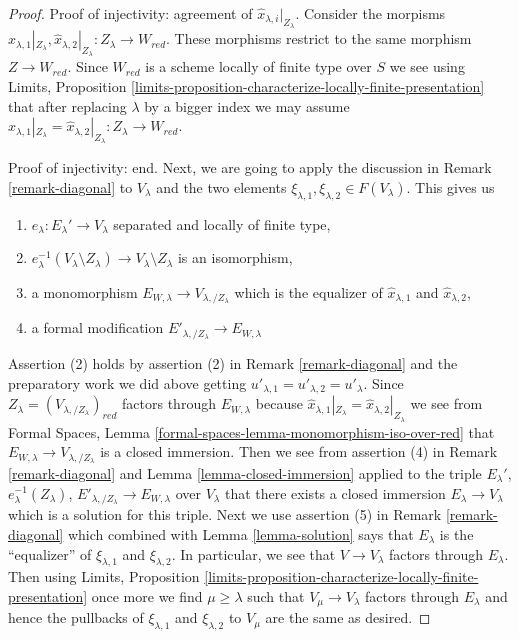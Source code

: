 \begin{proof}
\medskip\noindent
Proof of injectivity: agreement of $\hat x_{\lambda, i}|_{Z_\lambda}$.
Consider the morpisms
$\hat x_{\lambda, 1}|_{Z_\lambda}, \hat x_{\lambda, 2}|_{Z_\lambda} :
Z_\lambda \to W_{red}$.
These morphisms restrict to the same morphism $Z \to W_{red}$.
Since $W_{red}$ is a scheme locally of finite type over $S$
we see using Limits, Proposition
\ref{limits-proposition-characterize-locally-finite-presentation}
that after replacing $\lambda$ by a bigger index
we may assume
$\hat x_{\lambda, 1}|_{Z_\lambda} = \hat x_{\lambda, 2}|_{Z_\lambda} :
Z_\lambda \to W_{red}$.

\medskip\noindent
Proof of injectivity: end.
Next, we are going to apply the discussion in
Remark \ref{remark-diagonal} to $V_\lambda$ and the two elements
$\xi_{\lambda, 1}, \xi_{\lambda, 2} \in F(V_\lambda)$.
This gives us
\begin{enumerate}
\item $e_\lambda : E_\lambda' \to V_\lambda$
separated and locally of finite type,
\item $e_\lambda^{-1}(V_\lambda \setminus Z_\lambda) \to
V_\lambda \setminus Z_\lambda$ is an isomorphism,
\item a monomorphism $E_{W, \lambda} \to V_{\lambda, /Z_\lambda}$
which is the equalizer of $\hat x_{\lambda, 1}$ and $\hat x_{\lambda, 2}$,
\item a formal modification $E'_{\lambda, /Z_\lambda} \to E_{W, \lambda}$
\end{enumerate}
Assertion (2) holds by assertion (2) in Remark \ref{remark-diagonal}
and the preparatory work we did above getting
$u'_{\lambda, 1} = u'_{\lambda, 2} = u'_\lambda$.
Since $Z_\lambda = (V_{\lambda, /Z_\lambda})_{red}$ factors through
$E_{W, \lambda}$ because
$\hat x_{\lambda, 1}|_{Z_\lambda} = \hat x_{\lambda, 2}|_{Z_\lambda}$
we see from
Formal Spaces, Lemma \ref{formal-spaces-lemma-monomorphism-iso-over-red}
that $E_{W, \lambda} \to V_{\lambda, /Z_\lambda}$ is a closed immersion.
Then we see from assertion (4) in Remark \ref{remark-diagonal}
and Lemma \ref{lemma-closed-immersion} applied to the triple
$E_\lambda'$, $e_\lambda^{-1}(Z_\lambda)$,
$E'_{\lambda, /Z_\lambda} \to E_{W, \lambda}$ over $V_\lambda$ that
there exists a closed immersion $E_\lambda \to V_\lambda$
which is a solution for this triple.
Next we use assertion (5) in Remark \ref{remark-diagonal}
which combined with Lemma \ref{lemma-solution}
says that $E_\lambda$ is the ``equalizer'' of $\xi_{\lambda, 1}$
and $\xi_{\lambda, 2}$. In particular, we see that $V \to V_\lambda$
factors through $E_\lambda$. Then using Limits, Proposition
\ref{limits-proposition-characterize-locally-finite-presentation}
once more we find $\mu \geq \lambda$ such that $V_\mu \to V_\lambda$
factors through $E_\lambda$ and hence the pullbacks of
$\xi_{\lambda, 1}$ and $\xi_{\lambda, 2}$ to $V_\mu$ are the same
as desired.


\end{proof}
